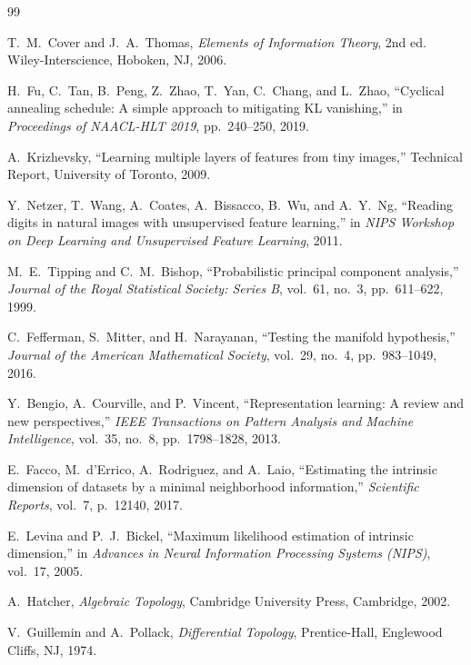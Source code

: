 \documentclass[11pt,a4paper]{jsarticle}
\begin{document}
\begin{thebibliography}{99}

T.~M.~Cover and J.~A.~Thomas,
\textit{Elements of Information Theory}, 2nd ed.
Wiley-Interscience, Hoboken, NJ, 2006.

H.~Fu, C.~Tan, B.~Peng, Z.~Zhao, T.~Yan, C.~Chang, and L.~Zhao,
``Cyclical annealing schedule: A simple approach to mitigating {KL} vanishing,''
in \textit{Proceedings of NAACL-HLT 2019}, pp.~240--250, 2019.

A.~Krizhevsky,
``Learning multiple layers of features from tiny images,''
Technical Report, University of Toronto, 2009.

Y.~Netzer, T.~Wang, A.~Coates, A.~Bissacco, B.~Wu, and A.~Y.~Ng,
``Reading digits in natural images with unsupervised feature learning,''
in \textit{NIPS Workshop on Deep Learning and Unsupervised Feature Learning}, 2011.

M.~E.~Tipping and C.~M.~Bishop,
``Probabilistic principal component analysis,''
\textit{Journal of the Royal Statistical Society: Series B}, vol.~61, no.~3,
pp.~611--622, 1999.

C.~Fefferman, S.~Mitter, and H.~Narayanan,
``Testing the manifold hypothesis,''
\textit{Journal of the American Mathematical Society}, vol.~29, no.~4,
pp.~983--1049, 2016.

Y.~Bengio, A.~Courville, and P.~Vincent,
``Representation learning: A review and new perspectives,''
\textit{IEEE Transactions on Pattern Analysis and Machine Intelligence},
vol.~35, no.~8, pp.~1798--1828, 2013.

E.~Facco, M.~d'Errico, A.~Rodriguez, and A.~Laio,
``Estimating the intrinsic dimension of datasets by a minimal neighborhood information,''
\textit{Scientific Reports}, vol.~7, p.~12140, 2017.

E.~Levina and P.~J.~Bickel,
``Maximum likelihood estimation of intrinsic dimension,''
in \textit{Advances in Neural Information Processing Systems (NIPS)}, vol.~17, 2005.

A.~Hatcher,
\textit{Algebraic Topology},
Cambridge University Press, Cambridge, 2002.

V.~Guillemin and A.~Pollack,
\textit{Differential Topology},
Prentice-Hall, Englewood Cliffs, NJ, 1974.


\end{thebibliography}
\end{document}
